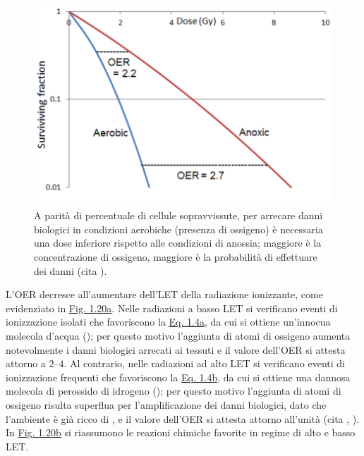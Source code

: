 \documentclass[12pt,a4paper,twoside]{report}
\begin{document}
	\begin{figure}[H]
		\centering
		\includegraphics[width=0.9\linewidth]{oer_survival.png}
		\caption{A parità di percentuale di cellule sopravvissute, per arrecare danni biologici in condizioni aerobiche (presenza di ossigeno) è necessaria una dose inferiore rispetto alle condizioni di anossia; maggiore è la concentrazione di ossigeno, maggiore è la probabilità di effettuare dei danni (cita
			).}
		\label{fig:oer_survival}
	\end{figure}
	
	L'OER decresce all'aumentare dell'LET della radiazione ionizzante, come evidenziato in \hyperref[fig:let_oer]{Fig. 1.20a}. Nelle radiazioni a basso LET si verificano eventi di ionizzazione isolati che favoriscono la \hyperref[eq:prodotto1]{Eq. 1.4a}, da cui si ottiene un'innocua molecola d'acqua (); per questo motivo l'aggiunta di atomi di ossigeno aumenta notevolmente i danni biologici arrecati ai tessuti e il valore dell'OER si attesta attorno a $2$--$4$. Al contrario, nelle radiazioni ad alto LET si verificano eventi di ionizzazione frequenti che favoriscono la \hyperref[eq:prodotto2]{Eq. 1.4b}, da cui si ottiene una dannosa molecola di perossido di idrogeno (); per questo motivo l'aggiunta di atomi di ossigeno risulta superflua per l'amplificazione dei danni biologici, dato che l'ambiente è già ricco di , e il valore dell'OER si attesta attorno all'unità (cita
	,
	). In \hyperref[fig:reaction_let]{Fig. 1.20b} si riassumono le reazioni chimiche favorite in regime di alto e basso LET.
	
\end{document}
